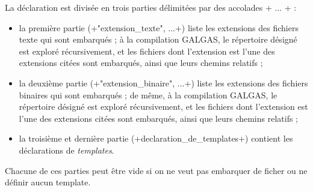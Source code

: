 La déclaration est divisée en trois parties délimitées par des accolades \ggs+{ ... }+ :
\begin{itemize}
  \item la première partie (\ggs+"extension_texte", ...+) liste les extensions des fichiers texte qui sont embarqués ; à la compilation GALGAS, le répertoire désigné est exploré récursivement, et les fichiers dont l'extension est l'une des extensions citées sont embarqués, ainsi que leurs chemins relatifs ;
  \item la deuxième partie (\ggs+"extension_binaire", ...+) liste les extensions des fichiers binaires qui sont embarqués ; de même, à la compilation GALGAS, le répertoire désigné est exploré récursivement, et les fichiers dont l'extension est l'une des extensions citées sont embarqués, ainsi que leurs chemins relatifs ;
  \item la troisième et dernière partie (\ggs+declaration_de_templates+) contient les déclarations de \emph{templates}.
\end{itemize}

Chacune de ces parties peut être vide si on ne veut pas embarquer de ficher ou ne définir aucun template.


